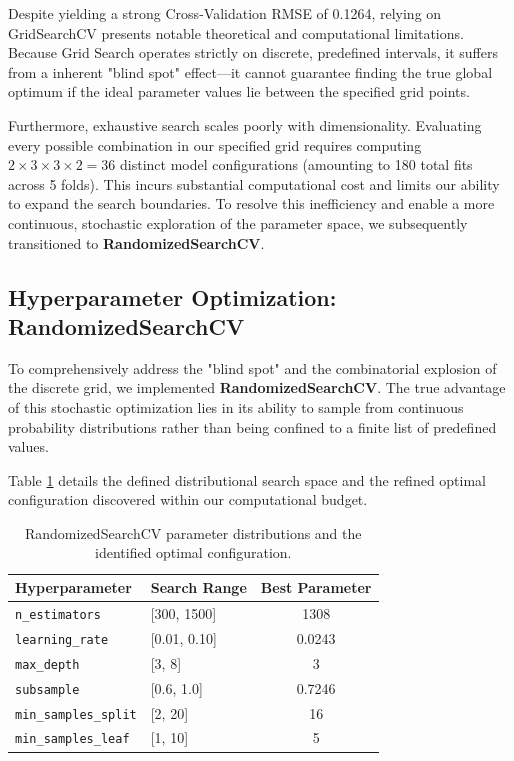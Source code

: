 \documentclass[11pt]{article}
\begin{document}
\noindent Despite yielding a strong Cross-Validation RMSE of 0.1264, relying on GridSearchCV presents notable theoretical and computational limitations. Because Grid Search operates strictly on discrete, predefined intervals, it suffers from a inherent "blind spot" effect—it cannot guarantee finding the true global optimum if the ideal parameter values lie between the specified grid points. 

\vspace{0.5em}
\noindent Furthermore, exhaustive search scales poorly with dimensionality. Evaluating every possible combination in our specified grid requires computing $2 \times 3 \times 3 \times 2 = 36$ distinct model configurations (amounting to 180 total fits across 5 folds). This incurs substantial computational cost and limits our ability to expand the search boundaries. To resolve this inefficiency and enable a more continuous, stochastic exploration of the parameter space, we subsequently transitioned to \textbf{RandomizedSearchCV}.

\subsection{Hyperparameter Optimization: RandomizedSearchCV}

\noindent To comprehensively address the "blind spot" and the combinatorial explosion of the discrete grid, we implemented \textbf{RandomizedSearchCV}. The true advantage of this stochastic optimization lies in its ability to sample from continuous probability distributions rather than being confined to a finite list of predefined values. 

\vspace{0.5em}
\noindent Table \ref{tab:random_search_params} details the defined distributional search space and the refined optimal configuration discovered within our computational budget.

\begin{table}[H]
    \centering
    \renewcommand{\arraystretch}{1.2}
    \begin{tabular}{llc}
        \toprule
        \textbf{Hyperparameter} & \textbf{Search Range} & \textbf{Best Parameter} \\
        \midrule
        \texttt{n\_estimators}       & [300, 1500]  & 1308 \\
        \texttt{learning\_rate}      & [0.01, 0.10] & 0.0243 \\
        \texttt{max\_depth}          & [3, 8]       & 3 \\
        \texttt{subsample}           & [0.6, 1.0]   & 0.7246 \\
        \texttt{min\_samples\_split} & [2, 20]      & 16 \\
        \texttt{min\_samples\_leaf}  & [1, 10]      & 5 \\
        \bottomrule
    \end{tabular}
    \caption{RandomizedSearchCV parameter distributions and the identified optimal configuration.}
    \label{tab:random_search_params}
\end{table}
\end{document}
